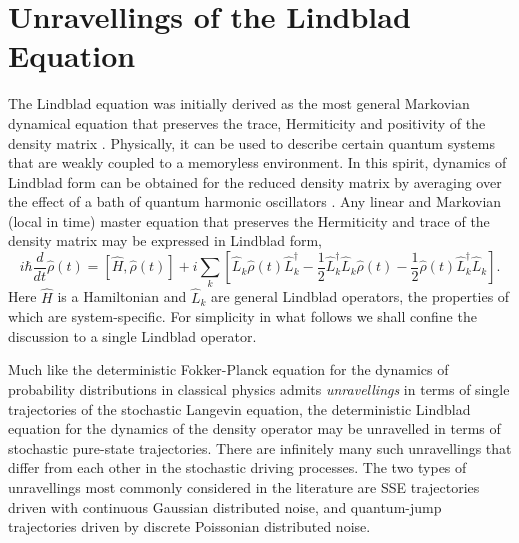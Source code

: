 \documentclass[12pt]{iopart} %
\begin{document}
\section{Unravellings of the Lindblad Equation} \label{sec:unravell}
 The Lindblad equation was initially derived as the most general Markovian dynamical equation that preserves the trace, Hermiticity and positivity of the density matrix \cite{gorini1976,lindblad1976generators}. Physically, it can be used to describe certain quantum systems that are weakly coupled to a memoryless environment. In this spirit, dynamics of Lindblad form can be obtained for the reduced density matrix by averaging over the effect of a bath of quantum harmonic oscillators \cite{petruccione}. Any linear and Markovian (local in time) master equation that preserves the Hermiticity and trace of the density matrix may be expressed in Lindblad form,
 \begin{equation} \label{eq:lindblad}
		i \hbar \frac{d}{d t}\hat{\rho}(t)=[\hat{H},\hat{\rho}(t)]  + i \sum_{k}[\hat{L}_k \hat{\rho}(t) \hat{L}_{k }^{\dagger} -\frac{1}{2} \hat{L}_k^{\dagger} \hat{L}_k\hat{\rho}(t)-\frac{1}{2} \hat{\rho}(t)\hat{L}_k^{\dagger} \hat{L}_k].
\end{equation}
Here $\hat H$ is a Hamiltonian and ${\hat L_k}$ are general Lindblad operators, the properties of which are system-specific. For simplicity in what follows we shall confine the discussion to a single Lindblad operator.

Much like the deterministic Fokker-Planck equation for the dynamics of probability distributions in classical physics admits \textit{unravellings} in terms of single trajectories of the stochastic Langevin equation, the deterministic Lindblad equation for the dynamics of the density operator may be unravelled in terms of stochastic pure-state trajectories. There are infinitely many such unravellings that differ from each other in the stochastic driving processes. The two types of unravellings most commonly considered in the literature are SSE trajectories \cite{gisin1992quantum} driven with continuous Gaussian distributed noise, and quantum-jump \cite{plenio1998quantum} trajectories driven by discrete Poissonian distributed noise.
\end{document}
